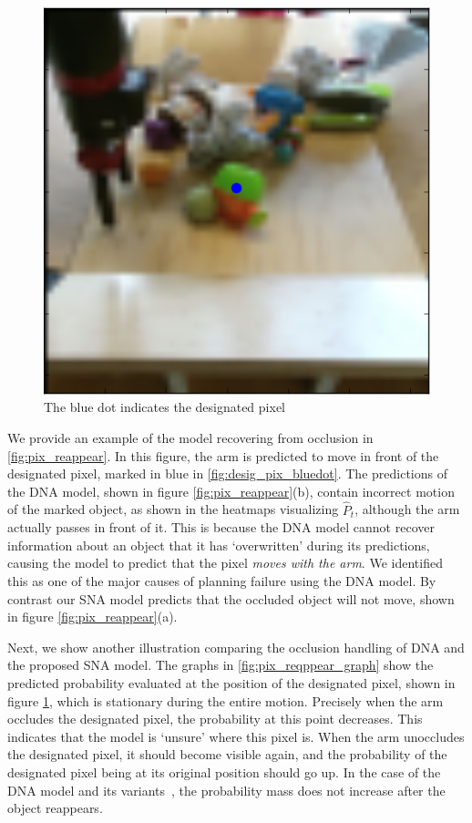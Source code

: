  \begin{figure}
	\centering
	\includegraphics[width=0.4\columnwidth]{images_sna/occlusionaware/img_desigpixb0.png}
	\caption{The blue dot indicates the designated pixel}
	\label{fig:desig_pix_bluedot}
\end{figure}

We provide an example of the model recovering from occlusion in \autoref{fig:pix_reappear}. In this figure, the arm is predicted to move in front of the designated pixel, marked in blue in \autoref{fig:desig_pix_bluedot}. The predictions of the DNA model, shown in figure \autoref{fig:pix_reappear}(b), contain incorrect motion of the marked object, as shown in the heatmaps visualizing $\hat{P}_t$, although the arm actually passes in front of it. This is because the DNA model cannot recover information about an object that it has `overwritten' during its predictions, causing the model to predict that the pixel \emph{moves with the arm}. We identified this as one of the major causes of planning failure using the DNA model. By contrast our SNA model predicts that the occluded object will not move, shown in figure  \autoref{fig:pix_reappear}(a).

Next, we show another illustration comparing the occlusion handling of DNA and the proposed SNA model. The graphs in \autoref{fig:pix_reqppear_graph} show the predicted probability evaluated at the position of the designated pixel, shown in figure \ref{fig:desig_pix_bluedot}, which is stationary during the entire motion. Precisely when the arm occludes the designated pixel, the probability at this point decreases. This indicates that the model is `unsure' where this pixel is. When the arm unoccludes the designated pixel, it should become visible again, and the probability of the designated pixel being at its original position should go up. In the case of the DNA model and its variants~\cite{finn_nips}, the probability mass does not increase after the object reappears. 
 
